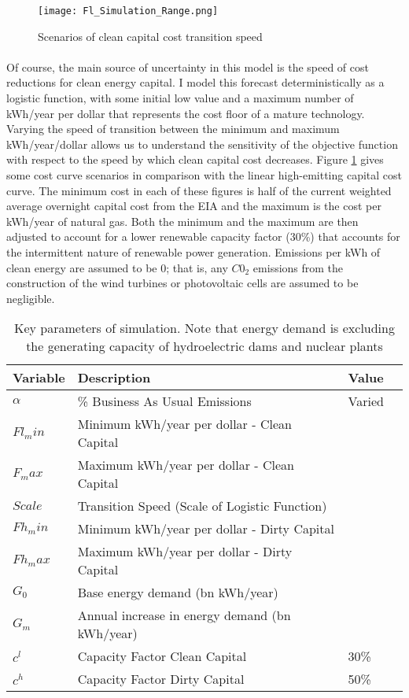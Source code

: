 \documentclass{easychithesis}
\begin{document}
\begin{figure}[h]
\texttt{[image: Fl\_Simulation\_Range.png]}
\caption{Scenarios of clean capital cost transition speed \label{fig:FlScaleScenarios}}
\end{figure}

\paragraph{} Of course, the main source of uncertainty in this model is the speed of cost reductions for clean energy capital. I model this forecast deterministically as a logistic function, with some initial low value and a maximum number of kWh/year per dollar that represents the cost floor of a mature technology. Varying the speed of transition between the minimum and maximum kWh/year/dollar allows us to understand the sensitivity of the objective function with respect to the speed by which clean capital cost decreases. Figure \ref{fig:FlScaleScenarios} gives some cost curve scenarios in comparison with the linear high-emitting capital cost curve. The minimum cost in each of these figures is half of the current weighted average overnight capital cost from the EIA and the maximum is the cost per kWh/year of natural gas. Both the minimum and the maximum are then adjusted to account for a lower renewable capacity factor (30\%) that accounts for the intermittent nature of renewable power generation. Emissions per kWh of clean energy are assumed to be 0; that is, any $C0_2$ emissions from the construction of the wind turbines or photovoltaic cells are assumed to be negligible. 


\begin{table}[h]\label{tab:ParamValues}
\begin{tabulary}{1.0\textwidth}{LLLL}
Variable & Description & Value\\
\hline
$\alpha$ &  \% Business As Usual Emissions  &  Varied \\
$Fl_min$ & Minimum kWh/year per dollar - Clean Capital & \\
$F_max$ & Maximum kWh/year per dollar - Clean Capital & \\
$Scale$ & Transition Speed  (Scale of Logistic Function) & \\
$Fh_min$ & Minimum kWh/year per dollar - Dirty Capital & \\
$Fh_max$ & Maximum kWh/year per dollar - Dirty Capital & \\
$G_0$ & Base energy demand (bn kWh/year) & \\
$G_m$ & Annual increase in energy demand (bn kWh/year) & \\
$c^l$ & Capacity Factor Clean Capital & 30\% \\
$c^h$ & Capacity Factor Dirty Capital & 50\% \\
\hline
\end{tabulary}
\caption{Key parameters of simulation. Note that energy demand is excluding the generating capacity of hydroelectric dams and nuclear plants}
\end{table}
\end{document}
